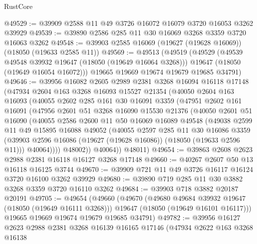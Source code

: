 \begin{lexlean}{RustCore}
\begin{coremodule}
@49529 := @39909 @2588 @11 @49 @3726 @16072 @16079 @3720 @16053 @3262 @39929
@49539 := @39890 @2586 @285 @11 @30 @16069 @3268 @3359 @3720 @16063 @3262
@49548 := @39903 @2585 @16069 (@19627 (@19628 @16069)) (@18050 (@19633 @2585 @11))
@49569 := @49513
    (@49519
      (@49529
        (@49539 @49548 @39932 @19647 (@18050 (@19649 @16064 @3268)))
        @19647
        (@18050 (@19649 @16054 @16072)))
      @19665
      @19669
      @19674
      @19679
      @19685
      @34791)
@49646 := @39956
    @16082
    @2605
    @2989
    @2381
    @3268
    @16094
    @16118
    @17148
    (@47934
      @2604
      @163
      @3268
      @16093
      @15527
      @21354
      (@40050
        @2604
        @163
        @16093
        (@40055
          @2602
          @285
          @161
          @30
          @16091
          @3359
          (@47951
            @2602
            @161
            @16091
            (@47956
              @2601
              @51
              @3268
              @16090
              @15530
              @21376
              (@40050
                @2601
                @51
                @16090
                (@40055
                  @2586
                  @2600
                  @11
                  @50
                  @16069
                  @16089
                  @49548
                  (@49038
                    @2599
                    @11
                    @49
                    @15895
                    @16088
                    @49052
                    (@40055
                      @2597
                      @285
                      @11
                      @30
                      @16086
                      @3359
                      (@39903 @2596 @16086 (@19627 (@19628 @16086)) (@18050 (@19633 @2596 @11)))
                      @40064))))
              @48002))
          @40064))
      @48011)
@49654 := @39863 @2608 @2623 @2988 @2381 @16118 @16127 @3268 @17148
@49660 := @40267 @2607 @50 @13 @16118 @16125 @3744
@49670 := @39909 @721 @11 @49 @3726 @16117 @16124 @3720 @16100 @3262 @39929
@49680 := @39890 @719 @285 @11 @30 @3882 @3268 @3359 @3720 @16110 @3262
@49684 := @39903 @718 @3882 @20187 @20191
@49705 := @49654
    (@49660
      (@49670
        (@49680 @49684 @39932 @19647 (@18050 (@19649 @16111 @3268)))
        @19647
        (@18050 (@19649 @16101 @16117)))
      @19665
      @19669
      @19674
      @19679
      @19685
      @34791)
@49782 := @39956
    @16127
    @2623
    @2988
    @2381
    @3268
    @16139
    @16165
    @17146
    (@47934
      @2622
      @163
      @3268
      @16138

\end{coremodule}
\end{lexlean}
